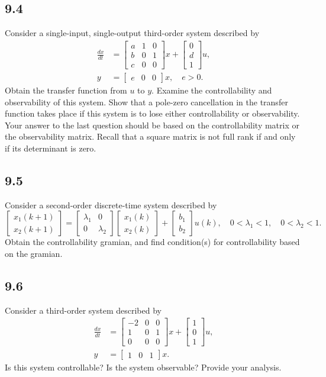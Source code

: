 \documentclass{article}
\newcommand{\problem}[2]{\subsection*{#1}}
\begin{document}
\problem{9.4}{}
Consider a single-input, single-output third-order system described by
\[
\begin{aligned}
\frac{dx}{dt} &= \begin{bmatrix} a & 1 & 0 \\ b & 0 & 1 \\ c & 0 & 0 \end{bmatrix} x + \begin{bmatrix} 0 \\ d \\ 1 \end{bmatrix} u, \\
y &= \begin{bmatrix} e & 0 & 0 \end{bmatrix} x, \quad e > 0.
\end{aligned}
\]
Obtain the transfer function from $u$ to $y$. Examine the controllability and observability of this system. Show that a pole-zero cancellation in the transfer function takes place if this system is to lose either controllability or observability. Your answer to the last question should be based on the controllability matrix or the observability matrix. Recall that a square matrix is not full rank if and only if its determinant is zero.

\problem{9.5}{}
Consider a second-order discrete-time system described by
\[
\begin{bmatrix} x_1(k + 1) \\ x_2(k + 1) \end{bmatrix} =
\begin{bmatrix} \lambda_1 & 0 \\ 0 & \lambda_2 \end{bmatrix}
\begin{bmatrix} x_1(k) \\ x_2(k) \end{bmatrix} +
\begin{bmatrix} b_1 \\ b_2 \end{bmatrix} u(k), \quad 0 < \lambda_1 < 1, \quad 0 < \lambda_2 < 1.
\]
Obtain the controllability gramian, and find condition(s) for controllability based on the gramian.

\problem{9.6}{third-order-checks}
Consider a third-order system described by
\[
\begin{aligned}
\frac{dx}{dt} &= \begin{bmatrix} -2 & 0 & 0 \\ 1 & 0 & 1 \\ 0 & 0 & 0 \end{bmatrix} x + \begin{bmatrix} 1 \\ 0 \\ 1 \end{bmatrix} u, \\
y &= \begin{bmatrix} 1 & 0 & 1 \end{bmatrix} x.
\end{aligned}
\]
Is this system controllable? Is the system observable? Provide your analysis.
\end{document}
